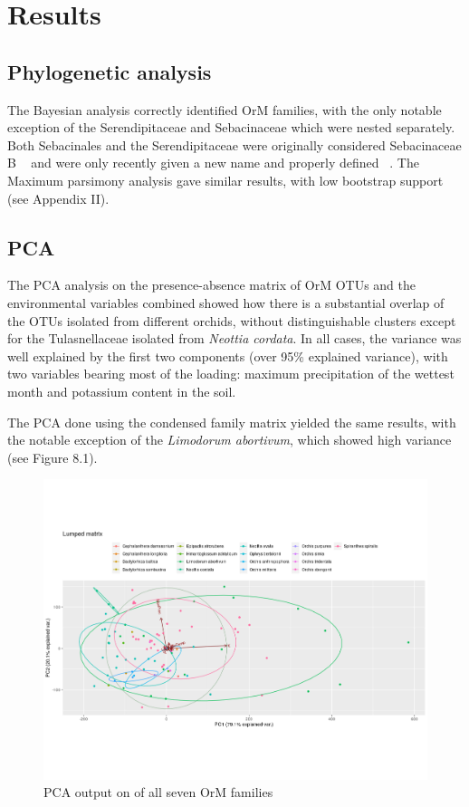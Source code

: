 \part{Results}
\label{results}

\chapter{Phylogenetic analysis}
\label{phylogeneticanalysis}

The Bayesian analysis correctly identified OrM families, with the only notable exception of the Serendipitaceae and Sebacinaceae which were nested separately. Both Sebacinales and the Serendipitaceae were originally considered Sebacinaceae B ~\citep{weiss2004} and were only recently given a new name and properly defined ~\citep{weiss2016}.
The Maximum parsimony analysis gave similar results, with low bootstrap support (see Appendix II).

\chapter{PCA}
\label{pca}

The PCA analysis on the presence-absence matrix of OrM OTUs and the environmental variables combined showed how there is a substantial overlap of the OTUs isolated from different orchids, without distinguishable clusters except for the Tulasnellaceae isolated from \emph{Neottia cordata}.
In all cases, the variance was well explained by the first two components (over 95\% explained variance), with two variables bearing most of the loading: maximum precipitation of the wettest month and potassium content in the soil.

The PCA done using the condensed family matrix yielded the same results, with the notable exception of the \emph{Limodorum abortivum}, which showed high variance (see Figure 8.1).

\begin{figure}[htbp]
\centering
\includegraphics[keepaspectratio,width=\textwidth,height=0.75\textheight]{images/lumpPCA.png}
\caption{PCA output on of all seven OrM families}
\end{figure}

